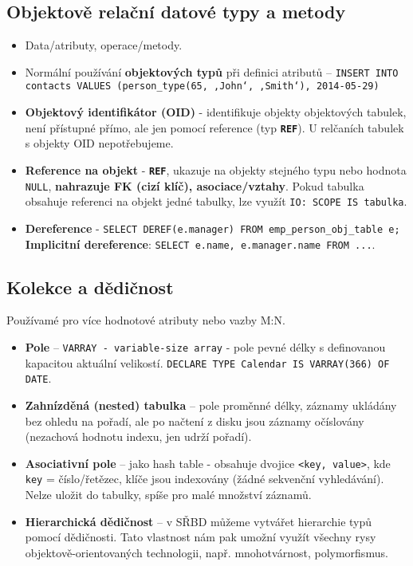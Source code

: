 \subsection{Objektově relační datové typy a metody}
\begin{itemize}
  \item Data/atributy, operace/metody.
  \item Normální používání \textbf{objektových typů} při definici atributů -- \texttt{INSERT INTO contacts VALUES (person\_type(65, ‚John‘, ‚Smith‘), 2014-05-29)}
  \item \textbf{Objektový identifikátor (OID)} - identifikuje objekty objektových tabulek, není přístupné přímo, ale jen pomocí reference (typ \texttt{\textbf{REF}}). U relčaních tabulek s objekty OID nepotřebujeme.
  \item \textbf{Reference na objekt} - \texttt{\textbf{REF}}, ukazuje na objekty stejného typu nebo hodnota \texttt{NULL}, \textbf{nahrazuje FK (cizí klíč), asociace/vztahy}. Pokud tabulka obsahuje referenci na objekt jedné tabulky, lze využít \texttt{IO: SCOPE IS tabulka}.
  \item \textbf{Dereference} - \texttt{SELECT DEREF(e.manager) FROM emp\_person\_obj\_table e;}  \textbf{Implicitní dereference}: \texttt{SELECT e.name, e.manager.name FROM ...}.
\end{itemize}

\subsection{Kolekce a dědičnost}
Používamé pro více hodnotové atributy nebo vazby M:N.
\begin{itemize}
  \item \textbf{Pole} -- \texttt{VARRAY - variable-size array} - pole pevné délky s definovanou kapacitou aktuální velikostí. \texttt{DECLARE TYPE Calendar IS VARRAY(366) OF DATE}.
  \item \textbf{Zahnízděná (nested) tabulka} -- pole proměnné délky, záznamy ukládány bez ohledu na pořadí, ale po načtení z disku jsou záznamy očíslovány (nezachová hodnotu indexu, jen udrží pořadí).
  \item \textbf{Asociativní pole} -- jako hash table - obsahuje dvojice \texttt{<key, value>}, kde \texttt{key} = číslo/řetězec, klíče jsou indexovány (žádné sekvenční vyhledávání). Nelze uložit do tabulky, spíše pro malé množství záznamů.
  \item \textbf{Hierarchická dědičnost} -- v SŘBD můžeme vytvářet hierarchie typů pomocí dědičnosti. Tato vlastnost nám pak umožní využít všechny rysy objektově-orientovaných technologii, např. mnohotvárnost, polymorfismus.
\end{itemize}


